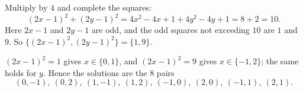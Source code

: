 Multiply by $4$ and complete the squares:
\[
(2x-1)^2+(2y-1)^2=4x^2-4x+1+4y^2-4y+1=8+2=10 .
\]
Here $2x-1$ and $2y-1$ are odd, and the odd squares not exceeding $10$ are $1$ and $9$. So $\{(2x-1)^2,(2y-1)^2\}=\{1,9\}$.

$(2x-1)^2=1$ gives $x\in\{0,1\}$, and $(2x-1)^2=9$ gives $x\in\{-1,2\}$; the same holds for $y$. Hence the solutions are the $\boxed{8}$ pairs
\[
(0,-1),\ (0,2),\ (1,-1),\ (1,2),\ (-1,0),\ (2,0),\ (-1,1),\ (2,1).
\]

